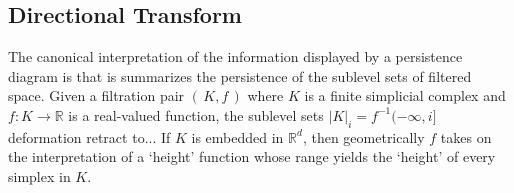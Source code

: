 \documentclass[10pt]{article}
\numberwithin{equation}{section}
\newcommand{\+}{%
	\raisebox{0.18ex}{\scaleobj{0.55}{+}}
}
\theoremstyle{definition}
\theoremstyle{definition}
\begin{document}




\subsection*{Directional Transform}
The canonical interpretation of the information displayed by a persistence diagram is that is summarizes the persistence of the sublevel sets of filtered space. Given a filtration pair $(\, K, f \, )$ where $K$ is a finite simplicial complex and $f : K \to \mathbb{R}$ is a real-valued function, the sublevel sets $\lvert K \rvert_i=f^{-1}(-\infty, i]$ deformation retract to... %
If $K$ is embedded in $\mathbb{R}^d$, then geometrically $f$ takes on the interpretation of a `height' function whose range yields the `height' of every simplex in $K$. 
\end{document}
